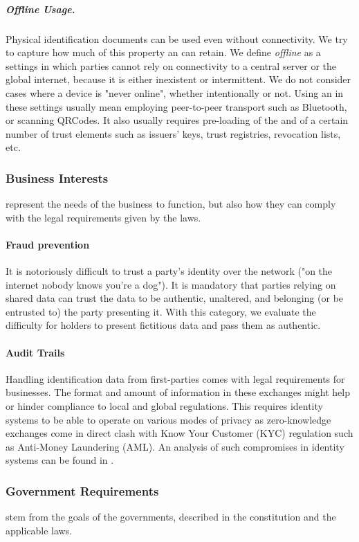 \subparagraph{Offline Usage.} Physical identification documents can be used even without connectivity. We try to capture how much of this property an \eid can retain. We define \emph{offline} as a settings in which parties cannot rely on connectivity to a central server or the global internet, because it is either inexistent or intermittent. We do not consider cases where a device is "never online", whether intentionally or not. Using an \eid in these settings usually mean employing peer-to-peer transport such as Bluetooth, or scanning QRCodes. It also usually requires pre-loading of the \eid and of a certain number of trust elements such as issuers' keys, trust registries, revocation lists, etc.

\subsubsection{Business Interests} represent the needs of the business to function, but also how they can comply with the legal requirements given by the laws.

\paragraph{Fraud prevention} It is notoriously difficult to trust a party's identity over the network ("on the internet nobody knows you're a dog"). It is mandatory that parties relying on shared data can trust the data to be authentic, unaltered, and belonging (or be entrusted to) the party presenting it. With this category, we evaluate the difficulty for holders to present fictitious data and pass them as authentic.

\paragraph{Audit Trails} Handling identification data from first-parties comes with legal requirements for businesses. The format and amount of information in these exchanges might help or hinder compliance to local and global regulations. This requires identity systems to be able to operate on various modes of privacy as zero-knowledge exchanges come in direct clash with Know Your Customer (KYC) regulation such as Anti-Money Laundering (AML). An analysis of such compromises in identity systems can be found in \cite{ABCD25}.

\subsubsection{Government Requirements} stem from the goals of the governments, described in the constitution and the applicable laws.

